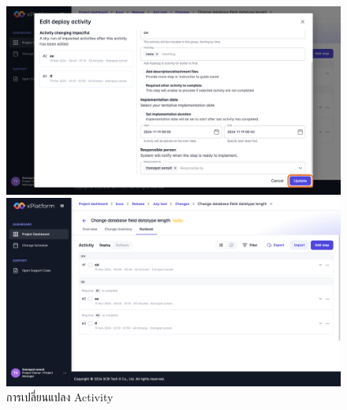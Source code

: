 \begin{figure}[H]
\begin{center}
    \includegraphics[width=\linewidth]{resources/pages/change-runbook/update-activity/9.png}

    \vspace{1in}

    \includegraphics[width=\linewidth]{resources/pages/change-runbook/update-activity/10.png}
\end{center}
\caption[การเปลี่ยนแปลง Activity]{การเปลี่ยนแปลง Activity}
\label{fig:update-activity}
\end{figure}

\newpage
